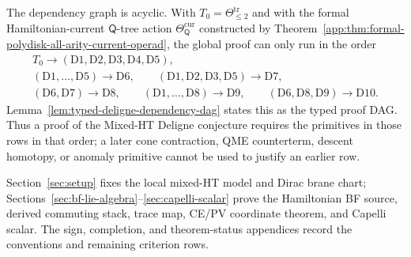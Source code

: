 \documentclass[11pt]{memoir}
\begin{document}
	  The dependency graph is acyclic.  With
	  \(T_0=\Theta^{\mathrm{tr}}_{\leq2}\) and with the formal
	  Hamiltonian-current \(\mathsf Q\)-tree action
	  \(\Theta_{\mathsf Q}^{\mathrm{cur}}\) constructed by
	  Theorem~\ref{app:thm:formal-polydisk-all-arity-current-operad}, the
	  global proof can only run in
	  the order
	  \[
	  \begin{gathered}
	    T_0\to(\mathrm{D1},\mathrm{D2},\mathrm{D3},\mathrm{D4},\mathrm{D5}),\\
	    (\mathrm{D1},\ldots,\mathrm{D5})\to\mathrm{D6},\qquad
	    (\mathrm{D1},\mathrm{D2},\mathrm{D3},\mathrm{D5})\to\mathrm{D7},\\
	    (\mathrm{D6},\mathrm{D7})\to\mathrm{D8},\qquad
	    (\mathrm{D1},\ldots,\mathrm{D8})\to\mathrm{D9},\qquad
	    (\mathrm{D6},\mathrm{D8},\mathrm{D9})\to\mathrm{D10}.
	  \end{gathered}
	  \]
	  Lemma~\ref{lem:typed-deligne-dependency-dag} states this as the
	  typed proof DAG.  Thus a proof of the Mixed-HT Deligne conjecture
	  requires the primitives in those rows in that order; a later
	  cone contraction, QME counterterm, descent homotopy, or anomaly
	  primitive cannot be used to justify an earlier row.

	  \medskip\noindent
	  Section~\ref{sec:setup} fixes the local mixed-HT model and Dirac brane
	  chart; Sections~\ref{sec:bf-lie-algebra}--\ref{sec:capelli-scalar}
  prove the Hamiltonian BF source, derived commuting stack, trace map,
  CE/PV coordinate theorem, and Capelli scalar.  The sign, completion,
  and theorem-status appendices record the conventions and remaining
  criterion rows.
\end{document}
